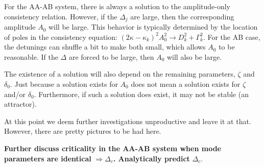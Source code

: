 For the AA-AB system, there is always a solution to the amplitude-only consistency relation. However, if the $\Delta_j$ are large, then the corresponding amplitude $A_0$ will be large. This behavior is typically determined by the location of poles in the consistency equation: $(2\kappa -\kappa_k)^2 A_0^2 \rightarrow D_k^2 + \Gamma_k^2$. For the AB case, the detunings can shuffle a bit to make both small, which allows $A_0$ to be reasonable. If the $\Delta$ are forced to be large, then $A_0$ will also be large.

The existence of a solution will also depend on the remaining parameters, $\zeta$ and $\delta_0$. Just because a solution exists for $A_0$ does not mean a solution exists for $\zeta$ and/or $\delta_0$. Furthermore, if such a solution does exist, it may not be stable (an attractor). 

At this point we deem further investigations unproductive and leave it at that. However, there are pretty pictures to be had here.


\textbf{Further discuss criticality in the AA-AB system when mode parameters are identical} $\Rightarrow\Delta_c$\textbf{. Analytically predict }$\Delta_c$.

